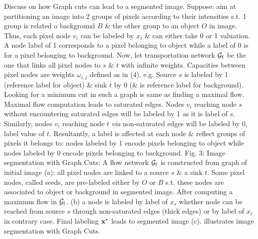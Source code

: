 \documentclass{article}
\begin{document}
\begin{itemize}
\begin{itemize}
        Discuss on how Graph cuts can lead to a segmented image. Suppose: aim at partitioning an image into 2 groups of pixels according to their intensities s.t. 1 group is related o background $B$ \& the other group to an object $O$ in image. Thus, each pixel node $v_i$ can be labeled by $x_i$ \& can either take 0 or 1 valuation. A node label of 1 corresponds to a pixel belonging to object while a label of 0 is for a pixel belonging to background. Now, let transportation network ${\cal G}_{\rm f}$ be the one that links all pixel nodes to $s$ \& $t$ with infinite weights. Capacities between pixel nodes are weights $\omega_{i,j}$ defined as in (4), e.g. Source $s$ is labeled by 1 (reference label for object) \& sink $t$ by 0 (\& is reference label for background). Looking for a minimum cut in such a graph is same as finding a maximal flow. Maximal flow computation leads to saturated edges. Nodes $v_i$ reaching node $s$ without encountering saturated edges will be labeled by 1 as it is label of $s$. Similarly, nodes $v_i$ reaching node $t$ {\it via} non-saturated edges will be labeled by 0, label value of $t$. Resultantly, a label is affected at each node \& reflect groups of pixels it belongs to: nodes labeled by 1 encode pixels belonging to object while nodes labeled by 0 encode pixels belonging to background. {\sf Fig. 3: Image segmentation with Graph Cuts: A flow network ${\cal G}_{\rm f}$ is constructed from graph of initial image (a): all pixel nodes are linked to a source $s$ \& a sink $t$. Some pixel nodes, called seeds, are pre-labeled either by $O$ or $B$ s.t. these nodes are associated to object or background in segmented image. After computing a maximum flow in ${\cal G}_{\rm f}$. (b) a node is labeled by label of $x_s$ whether node can be reached from source $s$ through non-saturated edges (thick edges) or by label of $x_t$ in contrary case. Final labeling ${\bf x}^*$ leads to segmented image (c).} illustrates image segmentation with Graph Cuts.
        

\end{itemize}
\end{itemize}
\end{document}
